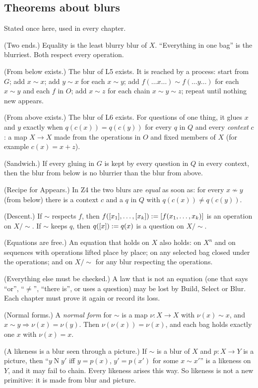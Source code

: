 \subsection*{Theorems about blurs}

Stated once here, used in every chapter.
\begin{lines}
\item[\lab{Z1}] (Two ends.) Equality is the least blurry blur of $X$. ``Everything in one bag'' is the blurriest. Both respect every operation.
\item[\lab{Z2}] (From below exists.) The blur of L5 exists. It is reached by a process: start from $G$; add $x \sim x$; add $y \sim x$ for each $x \sim y$; add $f(\dots x \dots) \sim f(\dots y \dots)$ for each $x \sim y$ and each $f$ in $O$; add $x \sim z$ for each chain $x \sim y \sim z$; repeat until nothing new appears.
\item[\lab{Z3}] (From above exists.) The blur of L6 exists. For questions of one thing, it glues $x$ and $y$ exactly when $q(c(x)) = q(c(y))$ for every $q$ in $Q$ and every \emph{context} $c$: a map $X \to X$ made from the operations in $O$ and fixed members of $X$ (for example $c(x) = x + z$).
\item[\lab{Z4}] (Sandwich.) If every gluing in $G$ is kept by every question in $Q$ in every context, then the blur from below is no blurrier than the blur from above.
\item[\lab{Z5}] (Recipe for Appears.) In Z4 the two blurs are \emph{equal} as soon as: for every $x \not\sim y$ (from below) there is a context $c$ and a $q$ in $Q$ with $q(c(x)) \neq q(c(y))$.
\item[\lab{Z6}] (Descent.) If $\sim$ respects $f$, then $f([x_1], \dots, [x_k]) := [f(x_1, \dots, x_k)]$ is an operation on $X/{\sim}$. If $\sim$ keeps $q$, then $q([x]) := q(x)$ is a question on $X/{\sim}$.
\item[\lab{Z7}] (Equations are free.) An equation that holds on $X$ also holds: on $X^n$ and on sequences with operations lifted place by place; on any selected bag closed under the operations; and on $X/{\sim}$ for any blur respecting the operations.
\item[\lab{Z8}] (Everything else must be checked.) A law that is not an equation (one that says ``or'', ``$\neq$'', ``there is'', or uses a question) may be lost by Build, Select or Blur. Each chapter must prove it again or record its loss.
\item[\lab{Z9}] (Normal forms.) A \emph{normal form} for $\sim$ is a map $\nu : X \to X$ with $\nu(x) \sim x$, and $x \sim y \Rightarrow \nu(x) = \nu(y)$. Then $\nu(\nu(x)) = \nu(x)$, and each bag holds exactly one $x$ with $\nu(x) = x$.
\item[\lab{Z10}] (A likeness is a blur seen through a picture.) If $\sim$ is a blur of $X$ and $p : X \to Y$ is a picture, then ``$y \mathrel{N} y'$ iff $y = p(x)$, $y' = p(x')$ for some $x \sim x'$'' is a likeness on $Y$, and it may fail to chain. Every likeness arises this way. So likeness is not a new primitive: it is made from blur and picture.
\end{lines}


